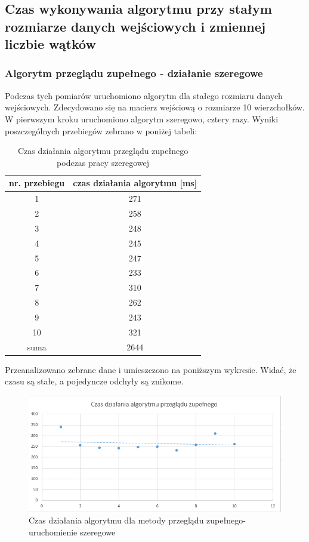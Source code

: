 \documentclass{article}
\begin{document}
	\subsection{Czas wykonywania algorytmu przy stałym rozmiarze danych wejściowych i zmiennej liczbie wątków}	
		
		\subsubsection{Algorytm przeglądu zupełnego - działanie szeregowe}
	
			Podczas tych pomiarów uruchomiono algorytm dla stałego rozmiaru danych wejściowych. Zdecydowano się na macierz wejściową o rozmiarze 10 wierzchołków. \\
			W pierwszym kroku uruchomiono algorytm szeregowo, cztery razy. Wyniki poszczególnych przebiegów zebrano w poniżej tabeli:
			\begin{table}[H]
				\centering
				\caption{Czas działania algorytmu przeglądu zupełnego podczas pracy szeregowej}
				\begin{tabular}{|c|c|}
					
					\hline nr. przebiegu  & czas działania algorytmu [ms] \\ 
					\hline  1 & 271 \\ 
					\hline  2 & 258 \\ 
					\hline  3 & 248 \\ 
					\hline  4 & 245 \\ 
					\hline  5 & 247 \\ 
					\hline  6 & 233 \\ 
					\hline  7 & 310 \\ 
					\hline  8 & 262 \\ 
					\hline  9 & 243 \\ 
					\hline  10 & 321 \\ 
					\hline  suma & 2644 \\ 
					\hline 
				\end{tabular} 
			\end{table}
			
			Przeanalizowano zebrane dane i umieszczono na poniższym wykresie. Widać, że czasu są stałe, a pojedyncze odchyły są znikome.
			
				\begin{figure}[H]
					\centering
					\includegraphics[width=0.9\linewidth]{BFS2}
					\caption{Czas działania algorytmu dla metody przeglądu zupełnego-uruchomienie szeregowe}
				\end{figure}
\end{document}
